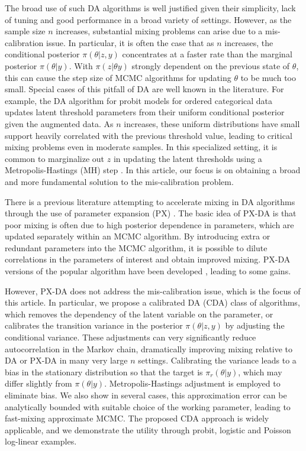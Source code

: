 \documentclass[10pt]{article}
\begin{document}
The broad use of such DA algorithms is well justified given their simplicity, lack of tuning and good performance in a broad variety of settings.  However, as the sample size $n$ increases, substantial mixing problems can arise due to a mis-calibration issue.  In particular, it is often the case that as $n$ increases, the conditional posterior $\pi( \theta | z, y)$ concentrates at a faster rate than the marginal posterior $\pi( \theta | y)$. {\color{red} With $\pi(  z|\theta y)$ strongly dependent on the previous state of $\theta$}, this can cause the step size of MCMC algorithms for updating $\theta$  to be much too small.  Special cases of this pitfall of DA are well known in the literature.  For example, the \cite{albert1993bayesian} DA algorithm for probit models for ordered categorical data updates latent threshold parameters from their uniform conditional posterior given the augmented data.   As $n$ increases, these uniform distributions have small support heavily correlated with the previous threshold value, leading to critical mixing problems even in moderate samples.  In this specialized setting, it is common to marginalize out $z$ in updating the latent thresholds using a Metropolis-Hastings (MH) step \citep{cowles1996accelerating}. In this article, our focus is on obtaining a broad and more fundamental solution to the mis-calibration problem.

There is a previous literature attempting to accelerate mixing in DA algorithms through the use of parameter expansion (PX) \citep{liu1999parameter}.  The basic idea of PX-DA is that poor mixing is often due to high posterior dependence in parameters, which are updated separately within an MCMC algorithm.  By introducing extra or redundant parameters into the MCMC algorithm, it is possible to dilute correlations in the parameters of interest and obtain improved mixing.  PX-DA versions of the popular \cite{albert1993bayesian} algorithm have been developed \citep{liu1999parameter}, leading to some gains.  

However, PX-DA does not address the mis-calibration issue, which is the focus of this article.  In particular, we propose a calibrated DA (CDA) class of algorithms, which {\color{red} removes the dependency of the latent variable on the parameter, or} calibrates the transition variance in the posterior $\pi( \theta | z, y)$ by adjusting the conditional variance.  These adjustments can very significantly reduce autocorrelation in the Markov chain, dramatically improving mixing relative to DA or PX-DA in many very large $n$ settings. Calibrating the variance leads to a bias in the stationary distribution so that the target is $\pi_r( \theta | y)$, which may differ slightly from $\pi( \theta | y)$.  Metropolis-Hastings adjustment is employed to eliminate bias. We also show in several cases, this approximation error can be analytically bounded with suitable choice of the working parameter, leading to fast-mixing approximate MCMC. The proposed CDA approach is widely applicable, and we demonstrate the utility through probit, logistic and Poisson log-linear examples.
\end{document}
